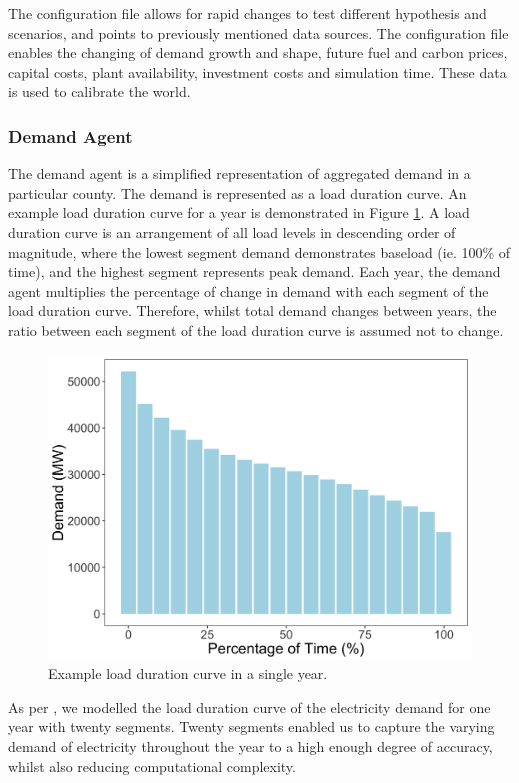 The configuration file allows for rapid changes to test different hypothesis and scenarios, and points to previously mentioned data sources. The configuration file enables the changing of demand growth and shape,  future fuel and carbon prices, capital costs, plant availability, investment costs and simulation time. These data is used to calibrate the world.

\subsubsection{Demand Agent}
The demand agent is a simplified representation of aggregated demand in a particular county. The demand is represented as a load duration curve. An example load duration curve for a year is demonstrated in Figure \ref{fig:loaddurationcurve}. A load duration curve is an arrangement of all load levels in descending order of magnitude, where the lowest segment demand demonstrates baseload (ie. 100\% of time), and the highest segment represents peak demand. Each year, the demand agent multiplies the percentage of change in demand with each segment of the load duration curve. Therefore, whilst total demand changes between years, the ratio between each segment of the load duration curve is assumed not to change.

\begin{figure}
	\centering
	\includegraphics[width=0.95\linewidth]{figures/load_duration_curve}
	\caption{Example load duration curve in a single year.}
	\label{fig:loaddurationcurve}
\end{figure}

As per \cite{Chappin2017}, we modelled the load duration curve of the electricity demand for one year with twenty segments. Twenty segments enabled us to capture the varying demand of electricity throughout the year to a high enough degree of accuracy, whilst also reducing computational complexity. 


